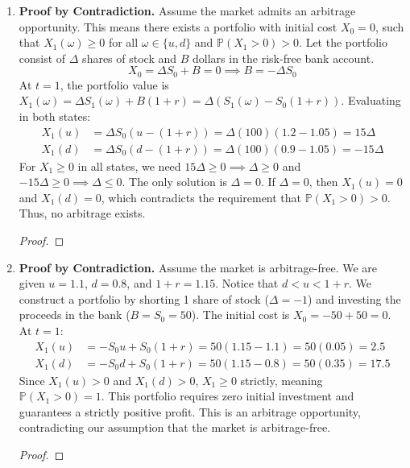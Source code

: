 \documentclass[11pt]{article}
\renewcommand{\qedsymbol}{$\blacksquare$}
\begin{document}
\begin{enumerate}
    \item \textbf{Proof by Contradiction.} Assume the market admits an arbitrage opportunity. This means there exists a portfolio with initial cost $X_0 = 0$, such that $X_1(\omega) \ge 0$ for all $\omega \in \{u, d\}$ and $\mathbb{P}(X_1 > 0) > 0$. Let the portfolio consist of $\Delta$ shares of stock and $B$ dollars in the risk-free bank account.
    \[ X_0 = \Delta S_0 + B = 0 \implies B = -\Delta S_0 \]
    At $t=1$, the portfolio value is $X_1(\omega) = \Delta S_1(\omega) + B(1+r) = \Delta(S_1(\omega) - S_0(1+r))$.
    Evaluating in both states:
    \begin{align*}
        X_1(u) &= \Delta S_0(u - (1+r)) = \Delta(100)(1.2 - 1.05) = 15\Delta \\
        X_1(d) &= \Delta S_0(d - (1+r)) = \Delta(100)(0.9 - 1.05) = -15\Delta
    \end{align*}
    For $X_1 \ge 0$ in all states, we need $15\Delta \ge 0 \implies \Delta \ge 0$ and $-15\Delta \ge 0 \implies \Delta \le 0$. The only solution is $\Delta = 0$. If $\Delta = 0$, then $X_1(u) = 0$ and $X_1(d) = 0$, which contradicts the requirement that $\mathbb{P}(X_1 > 0) > 0$. Thus, no arbitrage exists.
    \begin{proof}\renewcommand{\qedsymbol}{$\blacksquare$}\end{proof}

    \item \textbf{Proof by Contradiction.} Assume the market is arbitrage-free. We are given $u = 1.1$, $d = 0.8$, and $1+r = 1.15$. Notice that $d < u < 1+r$. We construct a portfolio by shorting 1 share of stock ($\Delta = -1$) and investing the proceeds in the bank ($B = S_0 = 50$). The initial cost is $X_0 = -50 + 50 = 0$. At $t=1$:
    \begin{align*}
        X_1(u) &= -S_0 u + S_0(1+r) = 50(1.15 - 1.1) = 50(0.05) = 2.5 \\
        X_1(d) &= -S_0 d + S_0(1+r) = 50(1.15 - 0.8) = 50(0.35) = 17.5
    \end{align*}
    Since $X_1(u) > 0$ and $X_1(d) > 0$, $X_1 \ge 0$ strictly, meaning $\mathbb{P}(X_1 > 0) = 1$. This portfolio requires zero initial investment and guarantees a strictly positive profit. This is an arbitrage opportunity, contradicting our assumption that the market is arbitrage-free.
    \begin{proof}\renewcommand{\qedsymbol}{$\blacksquare$}\end{proof}


\end{enumerate}
\end{document}
